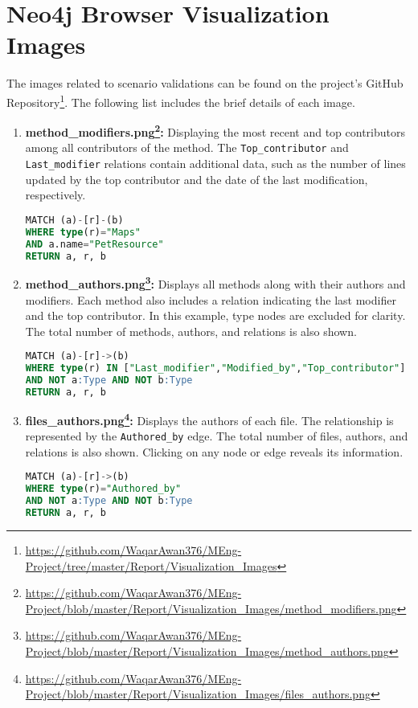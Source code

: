 \chapter{Neo4j Browser Visualization Images}\label{appendix_b}

\sloppy
The images related to scenario validations can be found on the project's GitHub Repository\footnote {\url{https://github.com/WaqarAwan376/MEng-Project/tree/master/Report/Visualization_Images}}. The following list includes the brief details of each image.

\begin{enumerate}[before={\vspace{10pt}}, after={\vspace{10pt}}, itemsep=10pt, nosep, leftmargin=\parindent, labelindent=0pt]
\item \textbf{method\_modifiers.png\footnote{\url{https://github.com/WaqarAwan376/MEng-Project/blob/master/Report/Visualization_Images/method_modifiers.png}}:} Displaying the most recent and top contributors among all contributors of the method. The \texttt{Top\_contributor} and \texttt{Last\_modifier} relations contain additional data, such as the number of lines updated by the top contributor and the date of the last modification, respectively. 
\begin{lstlisting}[language=SQL]
MATCH (a)-[r]-(b)
WHERE type(r)="Maps"
AND a.name="PetResource"
RETURN a, r, b
\end{lstlisting}
\vspace{10pt}

\item \textbf{method\_authors.png\footnote{\url{https://github.com/WaqarAwan376/MEng-Project/blob/master/Report/Visualization_Images/method_authors.png}}:} Displays all methods along with their authors and modifiers. Each method also includes a relation indicating the last modifier and the top contributor. In this example, type nodes are excluded for clarity. The total number of methods, authors, and relations is also shown.
\begin{lstlisting}[language=SQL]
MATCH (a)-[r]->(b)
WHERE type(r) IN ["Last_modifier","Modified_by","Top_contributor"]
AND NOT a:Type AND NOT b:Type
RETURN a, r, b
\end{lstlisting}
\vspace{10pt}

\item \textbf{files\_authors.png\footnote{\url{https://github.com/WaqarAwan376/MEng-Project/blob/master/Report/Visualization_Images/files_authors.png}}:} Displays the authors of each file. The relationship is represented by the \texttt{Authored\_by} edge. The total number of files, authors, and relations is also shown. Clicking on any node or edge reveals its information.
\begin{lstlisting}[language=SQL]
MATCH (a)-[r]->(b)
WHERE type(r)="Authored_by"
AND NOT a:Type AND NOT b:Type
RETURN a, r, b
\end{lstlisting}
\vspace{10pt}


\end{enumerate}
